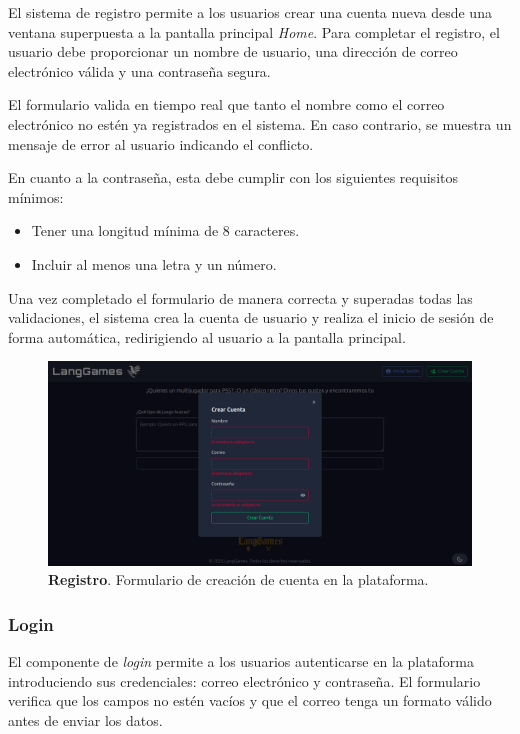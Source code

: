 El sistema de registro permite a los usuarios crear una cuenta nueva desde una ventana superpuesta a la pantalla principal \textit{Home}. Para completar el registro, el usuario debe proporcionar un nombre de usuario, una dirección de correo electrónico válida y una contraseña segura.

El formulario valida en tiempo real que tanto el nombre como el correo electrónico no estén ya registrados en el sistema. En caso contrario, se muestra un mensaje de error al usuario indicando el conflicto.

En cuanto a la contraseña, esta debe cumplir con los siguientes requisitos mínimos:
\begin{itemize}
	\item Tener una longitud mínima de 8 caracteres.
	\item Incluir al menos una letra y un número.
\end{itemize}

Una vez completado el formulario de manera correcta y superadas todas las validaciones, el sistema crea la cuenta de usuario y realiza el inicio de sesión de forma automática, redirigiendo al usuario a la pantalla principal.

\begin{figure}[H]
	\centering
	\includegraphics[width=1\linewidth]{imagenes/register.png}
	\caption[\textbf{Registro}.]{\textbf{Registro}. Formulario de creación de cuenta en la plataforma.}
	\label{imagen-register}
\end{figure}



\subsubsection{Login}

El componente de \textit{login} permite a los usuarios autenticarse en la plataforma introduciendo sus credenciales: correo electrónico y contraseña. El formulario verifica que los campos no estén vacíos y que el correo tenga un formato válido antes de enviar los datos.

